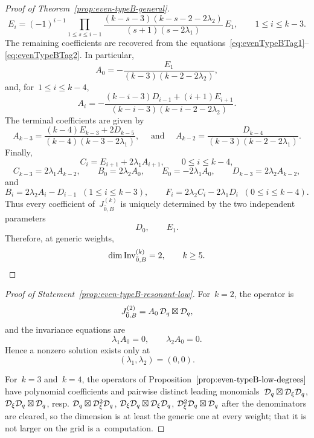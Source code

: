 \documentclass[12pt,a4paper]{amsart}
\theoremstyle{thm}
\theoremstyle{definition}
\newcommand {\Dq}{\cD_q}
\newcommand {\Dxi}{\cD_\xi}
\begin{document}
\begin{proof}[Proof of Theorem~\textup{\ref{prop:even-typeB-general}}]
\[
E_i
=
(-1)^{i-1}
\prod_{1\leq s\leq i-1}
\frac{(k-s-3)(k-s-2-2\lambda_2)}
{(s+1)(s-2\lambda_1)}
\,E_1,
\qquad
1\leq i\leq k-3.
\]
The remaining coefficients are recovered from the equations~\eqref{eq:evenTypeBTag1}--\eqref{eq:evenTypeBTag2}.
In particular,
\[
A_0
=
-\frac{E_1}
{(k-3)(k-2-2\lambda_2)},
\]
and, for~\(1\leq i\leq k-4\),
\[
A_i
=
-
\frac{
(k-i-3)D_{i-1}+(i+1)E_{i+1}
}{
(k-i-3)(k-i-2-2\lambda_2)
}.
\]
The terminal coefficients are given by
\[
A_{k-3}
=
\frac{
(k-4)E_{k-3}+2D_{k-5}
}{
(k-4)(k-3-2\lambda_1)
},
\quad \text{ and } \quad A_{k-2}
=
\frac{
D_{k-4}
}{
(k-3)(k-2-2\lambda_1)
}.
\]
Finally,
\[
C_i=E_{i+1}+2\lambda_1A_{i+1},
\qquad
0\leq i\leq k-4,
\]
\[
C_{k-3}=2\lambda_1A_{k-2},
\qquad
B_0=2\lambda_2A_0, \qquad E_0=-2 \lambda_1 A_0,
\qquad
D_{k-3}=2\lambda_2A_{k-2},
\]
and
\[B_i=2\lambda_2A_i-D_{i-1} \; \;(1\leq i \leq k-3),
\qquad
F_i=2\lambda_2C_i-2\lambda_1D_i \;\; (0\leq i \leq k-4).
\]
Thus every coefficient of~\(J_{\bar0,B}^{(k)}\) is uniquely determined
by the two independent parameters
\[
D_0,\qquad E_1.
\]
Therefore, at generic weights,
\[
\dim\operatorname{Inv}_{\bar0,B}^{(k)}=2,
\qquad k\geq5 .\qedhere
\]
\end{proof}

\begin{proof}[Proof of Statement~\textup{\ref{prop:even-typeB-resonant-low}}]
For~\(k=2\), the operator is
\[
J_{\bar0,B}^{(2)}=A_0\,\Dq\boxtimes \Dq,
\]
and the invariance equations are
\[
\lambda_1A_0=0,
\qquad
\lambda_2A_0=0.
\]
Hence a nonzero solution exists only at
\[
(\lambda_1,\lambda_2)=(0,0).
\]

For~$k=3$ and~$k=4$, the operators of Proposition~$\ref{prop:even-typeB-low-degrees}$ have
polynomial coefficients and pairwise distinct leading monomials~$\Dq\boxtimes\Dxi\Dq$,
$\Dxi\Dq\boxtimes\Dq$, resp. $\Dq\boxtimes\Dxi^2\Dq$, $\Dxi\Dq\boxtimes\Dxi\Dq$,
$\Dxi^2\Dq\boxtimes\Dq$ after the denominators are cleared, so the dimension is at least the
generic one at every weight; that it is not larger on the grid is a~computation.
\end{proof}
\end{document}
